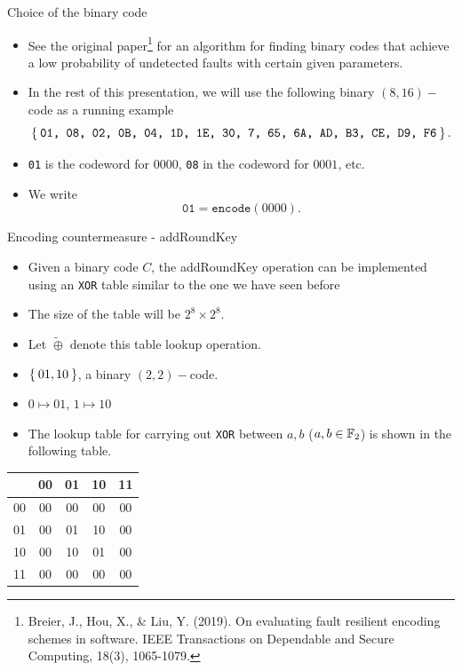 \begin{frame}{Choice of the binary code}
    \begin{itemize}
     \item See the original paper\footnote{Breier, J., Hou, X., \& Liu, Y. (2019). On evaluating fault resilient encoding schemes in software. IEEE Transactions on Dependable and Secure Computing, 18(3), 1065-1079.} for an algorithm for finding binary codes that achieve a low probability of undetected faults with certain given parameters.
     \item In the rest of this presentation, we will use the following binary $(8,16)-$code as a running example
\begin{equation*}
    \Set{\texttt{01, 08, 02, 0B, 04, 1D, 1E, 30, 7, 65, 6A, AD, B3, CE, D9, F6}}.
\end{equation*}
\item \texttt{01} is the codeword for $0000$, \texttt{08} in the codeword for $0001$, etc.
\item We write 
\[
\texttt{01}=\texttt{encode}(0000).
\]
    \end{itemize}
\end{frame}

\begin{frame}{Encoding countermeasure - addRoundKey}
    \begin{itemize}
        \item Given a binary code $C$, the addRoundKey operation can be implemented using an \texttt{XOR} table similar to the one we have seen before
        \item The size of the table will be $2^8\times2^8$.
        \item Let $\widetilde{\oplus}$ denote this table lookup operation.
    \end{itemize}
    \begin{example}
    \begin{itemize}
        \item $\Set{01,10}$, a binary $(2,2)-$code.
        \item $0\mapsto 01$, $1\mapsto 10$
        \item The lookup table for carrying out \texttt{XOR} between $a,b$ ($a,b\in{\mathbb F}_2$) is shown in the following table.
    \end{itemize}
\begin{table}[htb]
    \centering
    \begin{tabular}{c|c|c|c|c}
          &  00  &  01  & 10  & 11\\\hline
      00  &  00  &  00  & 00  & 00\\
      01  &  00  &  01  & 10   & 00 \\
      10  &  00  &  10  & 01  & 00 \\
      11  &  00  &  00  & 00  & 00 
    \end{tabular}
\end{table}
\end{example}
\end{frame}


